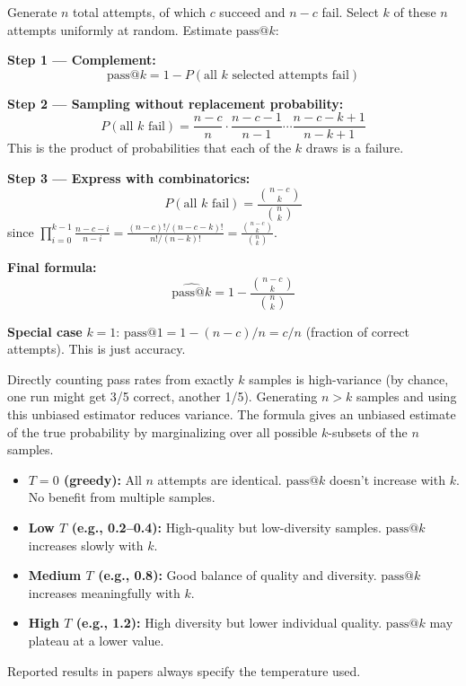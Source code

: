 \documentclass[11pt, a4paper]{article}
\begin{document}
\begin{mathbox}
Generate $n$ total attempts, of which $c$ succeed and $n-c$ fail. Select $k$ of these $n$ attempts uniformly at random. Estimate $\text{pass@}k$:

\textbf{Step 1 --- Complement:}
\[
\text{pass@}k = 1 - P(\text{all } k \text{ selected attempts fail})
\]

\textbf{Step 2 --- Sampling without replacement probability:}
\[
P(\text{all } k \text{ fail}) = \frac{n-c}{n} \cdot \frac{n-c-1}{n-1} \cdots \frac{n-c-k+1}{n-k+1}
\]
This is the product of probabilities that each of the $k$ draws is a failure.

\textbf{Step 3 --- Express with combinatorics:}
\[
P(\text{all } k \text{ fail}) = \frac{\binom{n-c}{k}}{\binom{n}{k}}
\]
since $\prod_{i=0}^{k-1} \frac{n-c-i}{n-i} = \frac{(n-c)!/(n-c-k)!}{n!/(n-k)!} = \frac{\binom{n-c}{k}}{\binom{n}{k}}$.

\textbf{Final formula:}
\[
\boxed{\widehat{\text{pass@}k} = 1 - \frac{\binom{n-c}{k}}{\binom{n}{k}}}
\]

\textbf{Special case} $k=1$:
$\text{pass@}1 = 1 - (n-c)/n = c/n$ (fraction of correct attempts). This is just accuracy.
\end{mathbox}

\begin{notebox}
Directly counting pass rates from exactly $k$ samples is high-variance (by chance, one run might get 3/5 correct, another 1/5). Generating $n > k$ samples and using this unbiased estimator reduces variance. The formula gives an unbiased estimate of the true probability by marginalizing over all possible $k$-subsets of the $n$ samples.
\end{notebox}

\begin{notebox}
\begin{itemize}[leftmargin=1.5em]
  \item \textbf{$T = 0$ (greedy):} All $n$ attempts are identical. $\text{pass@}k$ doesn't increase with $k$. No benefit from multiple samples.
  \item \textbf{Low $T$ (e.g., 0.2--0.4):} High-quality but low-diversity samples. $\text{pass@}k$ increases slowly with $k$.
  \item \textbf{Medium $T$ (e.g., 0.8):} Good balance of quality and diversity. $\text{pass@}k$ increases meaningfully with $k$.
  \item \textbf{High $T$ (e.g., 1.2):} High diversity but lower individual quality. $\text{pass@}k$ may plateau at a lower value.
\end{itemize}
Reported results in papers always specify the temperature used.
\end{notebox}
\end{document}
